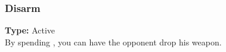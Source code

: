 \subsubsection{Disarm}
\label{iqty:disarm}
\textbf{Type:} Active\\
By spending \advantage\advantage, you can have the opponent
drop his weapon.

